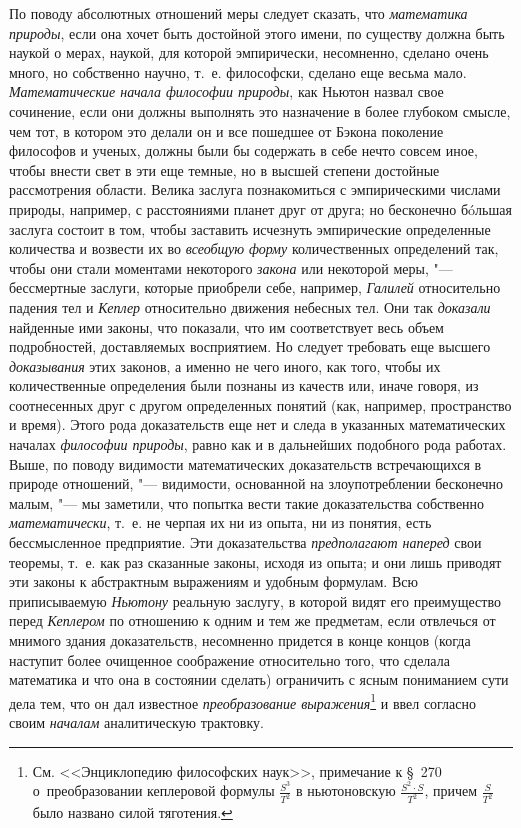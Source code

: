 По поводу абсолютных отношений меры следует сказать, что
{\em математика природы}, если она хочет быть достойной
этого имени, по существу должна быть наукой о мерах, наукой, для которой
эмпирически, несомненно, сделано очень много, но собственно научно, т.~е.
философски, сделано еще весьма мало.
{\em Математические начала философии природы}, как
Ньютон назвал свое сочинение, если они должны выполнять это назначение в
более глубоком смысле, чем тот, в котором это делали он и все пошедшее от
Бэкона поколение философов и ученых, должны были бы содержать в себе нечто
совсем иное, чтобы внести свет в эти еще темные, но в высшей степени
достойные рассмотрения области. Велика заслуга познакомиться с
эмпирическими числами природы, например, с расстояниями планет друг от
друга; но бесконечно бóльшая заслуга состоит в том, чтобы заставить
исчезнуть эмпирические определенные количества и возвести их во
{\em всеобщую форму} количественных определений так,
чтобы они стали моментами некоторого {\em закона} или
некоторой меры, "--- бессмертные заслуги, которые приобрели себе, например,
{\em Галилей} относительно падения тел и
{\em Кеплер} относительно движения небесных тел. Они
так {\em доказали} найденные ими законы, что показали,
что им соответствует весь объем подробностей, доставляемых восприятием. Но
следует требовать еще высшего {\em доказывания} этих
законов, а именно не чего иного, как того, чтобы их количественные
определения были познаны из качеств или, иначе говоря, из соотнесенных друг
с другом определенных понятий (как, например, пространство и время). Этого
рода доказательств еще нет и следа в указанных математических началах
{\em философии природы}, равно как и в дальнейших
подобного рода работах. Выше, по поводу видимости математических
доказательств встречающихся в природе отношений, "--- видимости, основанной на
злоупотреблении бесконечно малым, "--- мы заметили, что попытка вести такие
доказательства собственно {\em математически}, т.~е. не
черпая их ни из опыта, ни из понятия, есть бессмысленное предприятие. Эти
доказательства {\em предполагают наперед} свои
теоремы, т.~е. как раз сказанные законы, исходя из опыта; и они лишь
приводят эти законы к абстрактным выражениям и удобным формулам. Всю
приписываемую {\em Ньютону} реальную заслугу, в которой
видят его преимущество перед {\em Кеплером} по
отношению к одним и тем же предметам, если отвлечься от мнимого здания
доказательств, несомненно придется в конце концов (когда наступит более
очищенное соображение относительно того, что сделала математика и что она в
состоянии сделать) ограничить с ясным пониманием сути дела тем, что он дал
известное {\em преобразование выражения}\footnote{См. <<Энциклопедию философских
наук>>, примечание к §~270 о~преобразовании кеплеровой формулы
$\frac{S^3}{T^2}$ в ньютоновскую $\frac{S^2\cdot S}{T^2}$,
причем $\frac{S}{T^2}$ было названо силой тяготения.}
и ввел согласно своим {\em началам} аналитическую трактовку.

